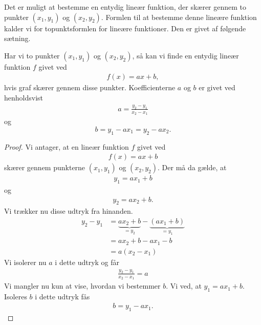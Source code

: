 \documentclass[12pt]{article}
\begin{document}
Det er muligt at bestemme en entydig lineær funktion, der skærer gennem to punkter $(x_1,y_1)$ og $(x_2,y_2)$. Formlen til at bestemme denne lineære funktion kalder vi for topunktsformlen for lineære funktioner. Den er givet af følgende sætning. 
\begin{setn}
Har vi to punkter $(x_1,y_1)$ og $(x_2,y_2)$, så kan vi finde en entydig lineær funktion $f$ givet ved
\begin{align*}
f(x) = ax+b,
\end{align*}
hvis graf skærer gennem disse punkter. Koefficienterne $a$ og $b$ er givet ved henholdsvist
\begin{align*}
a = \frac{y_2-y_1}{x_2-x_1}
\end{align*}
og 
$$b = y_1-ax_1 = y_2-ax_2.$$
\end{setn}
\begin{proof}
Vi antager, at en lineær funktion $f$ givet ved
\begin{align*}
f(x) = ax+b
\end{align*}
skærer gennem punkterne $(x_1,y_1)$ og $(x_2,y_2)$. Der må da gælde, at 
\begin{align*}
y_1 = ax_1 + b
\end{align*}
og 
\begin{align*}
y_2 = ax_2 + b.
\end{align*}
Vi trækker nu disse udtryk fra hinanden.
\begin{align*}
y_2 - y_1 &= \underbrace{ax_2+b}_{=y_2}-\underbrace{(ax_1+b)}_{=y_1}\\
&= ax_2 + b -ax_1 - b\\
&= a(x_2-x_1)
\end{align*}
Vi isolerer nu $a$ i dette udtryk og får
\begin{align*}
\frac{y_2-y_1}{x_2-x_1} = a
\end{align*}
Vi mangler nu kun at vise, hvordan vi bestemmer $b$. Vi ved, at $y_1 = ax_1 + b$. Isoleres $b$ i dette udtryk fås
\begin{align*}
b = y_1 - ax_1.
\end{align*}

\end{proof}
\end{document}
